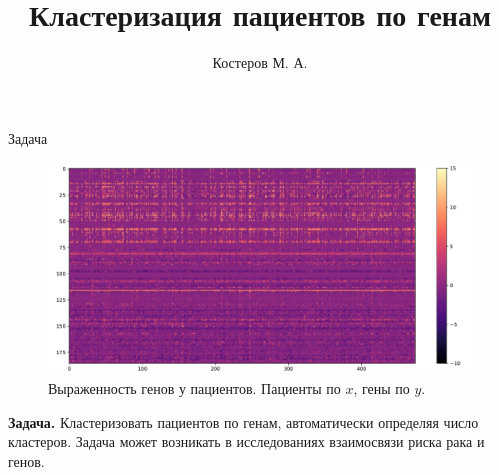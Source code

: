 \documentclass{beamer}
\title{Кластеризация пациентов по генам}
\author{Костеров М. А.}
\date{}
\begin{document}
\begin{frame}
  \titlepage
\end{frame}

\begin{frame}{Задача}
  \begin{figure}
    \includegraphics[width=1.0\textwidth]{./figures/full_genes.pdf}

    \caption{Выраженность генов у пациентов. Пациенты по $x$, гены по $y$.}
  \end{figure}

  {\bf Задача.} Кластеризовать пациентов по генам, автоматически определяя
  число кластеров. Задача может возникать в исследованиях взаимосвязи риска
  рака и генов.
\end{frame}
\end{document}
